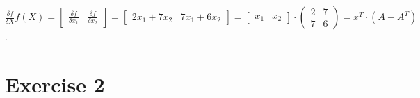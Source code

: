 \documentclass[%
   10pt,              %
   a4paper,           %
   DIV10,             %
]{scrartcl}%
\begin{document}
\begin{itemize}
	\noindent $\frac{\delta f}{\delta X} f(X) = \begin{bmatrix}
	\frac{\delta f}{\delta x_1} & \frac{\delta f}{\delta x_2}
	\end{bmatrix} = \begin{bmatrix}
	2x_1 + 7x_2 & 7x_1 + 6x_2
	\end{bmatrix} = \begin{bmatrix}
	x_1 & x_2
	\end{bmatrix} \cdot \begin{pmatrix}
	2 & 7\\
	7 & 6
	\end{pmatrix} = x^T \cdot (A + A^T)$.
\end{itemize}

\section*{Exercise 2}
\end{document}
